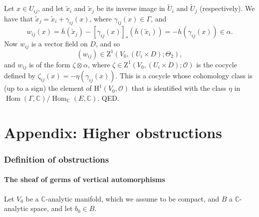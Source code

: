 \documentclass{article}
\renewcommand{\cal}[1]{{\mathcal{#1}}}
\newcommand{\CC}{\mathbb{C}}
\newcommand{\HH}{\mathrm{H}}
\DeclareMathOperator{\Hom}{Hom}
\newcommand{\oldpage}[1]{\marginpar{\footnotesize$\Big\vert$ \textit{p.~#1}}}
\begin{document}
Let $x\in U_{ij}$, and let $\widetilde{x}_i$ and $\widetilde{x}_j$ be its inverse image in $\widetilde{U}_i$ and $\widetilde{U}_j$ (respectively).
We have that $\widetilde{x}_j=\widetilde{x}_i+\gamma_{ij}(x)$, where $\gamma_{ij}(x)\in\Gamma$, and
\[
  w_{ij}(x)
  = \overline{h}(\widetilde{x}_j) - [\gamma_{ij}(x)]_*(\overline{h}(\widetilde{x}_i))
  = -h(\gamma_{ij}(x)) \in\alpha.
\]
Now $w_{ij}$ is a vector field on $D$, and so
\[
  (w_{ij}) \in \mathrm{Z}^1(V_0,(U_i\times D);\Theta_2),
\]
and $w_{ij}$ is of the form $\zeta\otimes\alpha$, where $\zeta\in\mathrm{Z}^1(V_0,(U_i\times D);\cal{O})$ is the cocycle defined by $\zeta_{ij}(x)=-\eta(\gamma_{ij}(x))$.
This is a cocycle whose cohomology class is (up to a sign) the element of $\HH^1(V_0,\cal{O})$ that is identified with the class $\eta$ in $\Hom(\Gamma,\CC)/\Hom_{\CC}(E,\CC)$.
QED.



\part*{Appendix: Higher obstructions}
\label{appendix}
\setcounter{section}{0}

\section{Definition of obstructions}
\label{AI}

\subsection{The sheaf of germs of vertical automorphisms}
\label{AI.1}

\oldpage{4-10}

Let $V_0$ be a $\CC$-analytic manifold, which we assume to be compact, and $B$ a $\CC$-analytic space, and let $b_0\in B$.






\nocite{*}
\end{document}
